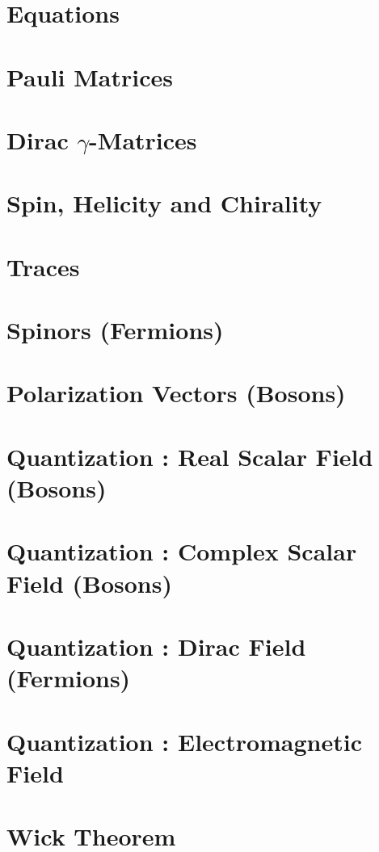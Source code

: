 \documentclass[landscape,8pt,a4paper,english]{extarticle}
\begin{document}
\begin{multicols*}{3}\centering
        \section*{Equations}
        \section*{Pauli Matrices}
        \section*{Dirac $\gamma$-Matrices}
        \section*{Spin, Helicity and Chirality}
        \section*{Traces}
        \section*{Spinors (Fermions)}
        \section*{Polarization Vectors (Bosons)}
        \section*{Quantization : Real Scalar Field (Bosons)}
        \section*{Quantization : Complex Scalar Field (Bosons)}
        \section*{Quantization : Dirac Field (Fermions)}
        \section*{Quantization : Electromagnetic Field}
        \section*{Wick Theorem}

\end{multicols*}
\end{document}
